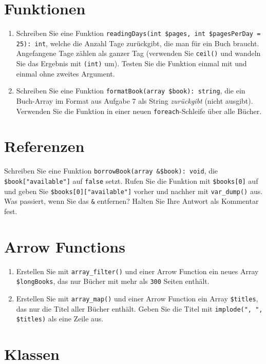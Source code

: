 \documentclass[a4paper,12pt]{article}
\begin{document}
\section{Funktionen}

\begin{enumerate}
    \item Schreiben Sie eine Funktion \texttt{readingDays(int \$pages, int \$pagesPerDay = 25): int}, welche die Anzahl Tage zurückgibt, die man für ein Buch braucht. Angefangene Tage zählen als ganzer Tag (verwenden Sie \texttt{ceil()} und wandeln Sie das Ergebnis mit \texttt{(int)} um). Testen Sie die Funktion einmal mit und einmal ohne zweites Argument.
    \item Schreiben Sie eine Funktion \texttt{formatBook(array \$book): string}, die ein Buch-Array im Format aus Aufgabe 7 als String \emph{zurückgibt} (nicht ausgibt). Verwenden Sie die Funktion in einer neuen \texttt{foreach}-Schleife über alle Bücher.
\end{enumerate}

\section{Referenzen}

Schreiben Sie eine Funktion \texttt{borrowBook(array \&\$book): void}, die \texttt{\$book["{}available"{}]} auf \texttt{false} setzt. Rufen Sie die Funktion mit \texttt{\$books[0]} auf und geben Sie \texttt{\$books[0]["{}available"{}]} vorher und nachher mit \texttt{var\_dump()} aus. Was passiert, wenn Sie das \texttt{\&} entfernen? Halten Sie Ihre Antwort als Kommentar fest.

\section{Arrow Functions}

\begin{enumerate}
    \item Erstellen Sie mit \texttt{array\_filter()} und einer Arrow Function ein neues Array \texttt{\$longBooks}, das nur Bücher mit mehr als \texttt{300} Seiten enthält.
    \item Erstellen Sie mit \texttt{array\_map()} und einer Arrow Function ein Array \texttt{\$titles}, das nur die Titel aller Bücher enthält. Geben Sie die Titel mit \texttt{implode("{}, "{}, \$titles)} als eine Zeile aus.
\end{enumerate}

\section{Klassen}
\end{document}
